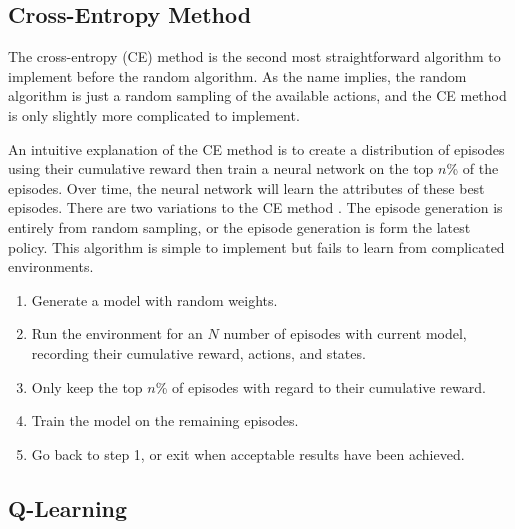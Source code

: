 \subsection{Cross-Entropy Method}

The cross-entropy (CE) method is the second most straightforward algorithm to implement before the random algorithm. As the name implies, the random algorithm is just a random sampling of the available actions, and the CE method is only slightly more complicated to implement.

An intuitive explanation of the CE method is to create a distribution of episodes using their cumulative reward then train a neural network on the top $n$\% of the episodes. Over time, the neural network will learn the attributes of these best episodes. There are two variations to the CE method \cite{boer_kroese_mannor_rubinstein_2005}. The episode generation is entirely from random sampling, or the episode generation is form the latest policy. This algorithm is simple to implement but fails to learn from complicated environments. 

\begin{enumerate}[label=Step \arabic*:, itemsep=0mm]
	\item Generate a model with random weights.
	\item Run the environment for an $N$ number of episodes with current model, recording their cumulative reward, actions, and states.
	\item Only keep the top $n$\% of episodes with regard to their cumulative reward.
	\item Train the model on the remaining episodes.
	\item Go back to step 1, or exit when acceptable results have been achieved.
\end{enumerate}

\subsection{Q-Learning}

